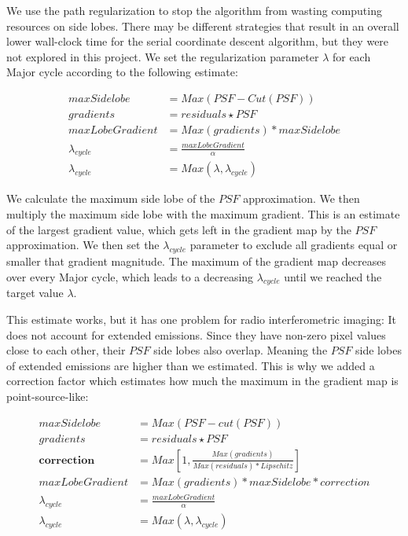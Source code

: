 We use the path regularization to stop the algorithm from wasting computing resources on side lobes. There may be different strategies that result in an overall lower wall-clock time for the serial coordinate descent algorithm, but they were not explored in this project. We set the regularization parameter $\lambda$ for each Major cycle according to the following estimate:

\begin{equation}
\begin{split}
maxSidelobe &= Max(PSF - Cut(PSF)) \\
gradients &= residuals \star PSF \\
maxLobeGradient &= Max(gradients) * maxSidelobe \\
\lambda_{cycle} &= \frac{maxLobeGradient}{\alpha}\\
\lambda_{cycle} &= Max(\lambda, \lambda_{cycle})
\end{split}
\end{equation}

We calculate the maximum side lobe of the $PSF$ approximation. We then multiply the maximum side lobe with the maximum gradient. This is an estimate of the largest gradient value, which gets left in the gradient map by the $PSF$ approximation. We then set the $\lambda_{cycle}$ parameter to exclude all gradients equal or smaller that gradient magnitude. The maximum of the gradient map decreases over every Major cycle, which leads to a decreasing $\lambda_{cycle}$ until we reached the target value $\lambda$.

This estimate works, but it has one problem for radio interferometric imaging: It does not account for extended emissions. Since they have non-zero pixel values close to each other, their $PSF$ side lobes also overlap. Meaning the $PSF$ side lobes of extended emissions are higher than we estimated. This is why we added a correction factor which estimates how much the maximum in the gradient map is point-source-like:

\begin{equation}
\begin{split}
maxSidelobe &= Max(PSF - cut(PSF)) \\
gradients &= residuals \star PSF \\
\textbf{correction} &= Max \left [1, \frac{Max(gradients)}{Max(residuals) * Lipschitz} \right ] \\
maxLobeGradient &= Max(gradients) * maxSidelobe * correction \\
\lambda_{cycle} &= \frac{maxLobeGradient}{\alpha}\\
\lambda_{cycle} &= Max(\lambda, \lambda_{cycle})
\end{split}
\end{equation}

